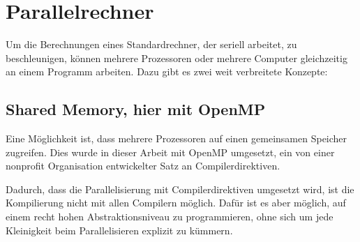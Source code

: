 \documentclass{scrreprt}
\begin{document}
		
	\section{Parallelrechner}
	\label{sec:partheorie}
	Um die Berechnungen eines Standardrechner, der seriell arbeitet, zu beschleunigen, können mehrere Prozessoren oder mehrere Computer gleichzeitig an einem Programm arbeiten. Dazu gibt es zwei weit verbreitete Konzepte:
	\subsection{Shared Memory, hier mit OpenMP}
	\label{subsec:openmptheorie}
	Eine Möglichkeit ist, dass mehrere Prozessoren auf einen gemeinsamen Speicher zugreifen. Dies wurde in dieser Arbeit mit OpenMP umgesetzt, ein von einer nonprofit Organisation entwickelter Satz an Compilerdirektiven\cite{specificationsopenmp}.
	
	Dadurch, dass die Parallelisierung mit Compilerdirektiven umgesetzt wird, ist die Kompilierung nicht mit allen Compilern möglich. Dafür ist es aber möglich, auf einem recht hohen Abstraktionsniveau zu programmieren, ohne sich um jede Kleinigkeit beim Parallelisieren explizit zu kümmern\cite[vgl. ][S. 209]{pachecoparallel}.	
	
\end{document}
